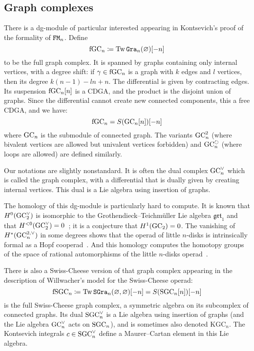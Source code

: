 \subsection{Graph complexes}
\label{cnfbnd.sec.graph-complexes}

There is a dg-module of particular interested appearing in Kontsevich's proof of the formality of $\mathtt{FM}_{n}$.
Define
\begin{equation}
  \mathrm{fGC}_{n} \coloneqq \operatorname{Tw} \mathtt{Gra}_{n}(\varnothing)[-n]
\end{equation}
to be the full graph complex.
It is spanned by graphs containing only internal vertices, with a degree shift: if $\gamma \in \mathrm{fGC}_{n}$ is a graph with $k$ edges and $l$ vertices, then its degree $k(n-1) - l n + n$.
The differential is given by contracting edges.
Its suspension $\mathrm{fGC}_{n}[n]$ is a CDGA, and the product is the disjoint union of graphs.
Since the differential cannot create new connected components, this a free CDGA, and we have:
\begin{equation}
  \mathrm{fGC}_{n} = S(\mathrm{GC}_{n}[n])[-n]
\end{equation}
where $\mathrm{GC}_{n}$ is the submodule of connected graph.
The variants $\mathrm{GC}_{n}^{2}$ (where bivalent vertices are allowed but univalent vertices forbidden) and $\mathrm{GC}_{n}^{\circlearrowright}$ (where loops are allowed) are defined similarly.

\begin{remark}
  Our notations are slightly nonstandard.
  It is often the dual complex $\mathrm{GC}_{n}^{\vee}$ which is called the graph complex, with a differential that is dually given by creating internal vertices.
  This dual is a Lie algebra using insertion of graphs.
\end{remark}

The homology of this dg-module is particularly hard to compute.
It is known that $H^{0}(\mathrm{GC}_{2}^{\vee})$ is isomorphic to the Grothendieck--Teichmüller Lie algebra $\mathfrak{grt}_{1}$ and that $H^{<0}(\mathrm{GC}_{2}^{\vee}) = 0$~\cite{Willwacher2014}; it is a conjecture that $H^{1}(\mathrm{GC}_{2}) = 0$.
The vanishing of $H^{*}(\mathrm{GC}^{2,\vee}_{n})$ in some degrees shows that the operad of little $n$-disks is intrinsically formal as a Hopf cooperad~\cite{FresseWillwacher2015}.
And this homology computes the homotopy groups of the space of rational automorphisms of the little $n$-disks operad~\cite{FresseTurchinWillwacher2017}.

There is also a Swiss-Cheese version of that graph complex appearing in the description of Willwacher's model for the Swiss-Cheese operad:
\begin{equation}
  \label{cnfbnd.eq.fsgcn}
  \mathrm{fSGC}_{n} \coloneqq \operatorname{Tw} \mathtt{SGra}_{n}(\varnothing, \varnothing)[-n] = S(\mathrm{SGC}_{n}[n])[-n]
\end{equation}
is the full Swiss-Cheese graph complex, a symmetric algebra on its subcomplex of connected graphs.
Its dual $\mathrm{SGC}_{n}^{\vee}$ is a Lie algebra using insertion of graphs (and the Lie algebra $\mathrm{GC}_{n}^{\vee}$ acts on $\mathrm{SGC}_{n}$), and is sometimes also denoted $\mathrm{KGC}_{n}$.
The Kontsevich integrals $c \in \mathrm{SGC}_{n}^{\vee}$ define a Maurer--Cartan element in this Lie algebra.

